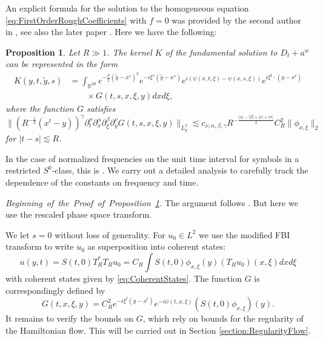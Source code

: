 \documentclass{amsart}
\newtheorem{proposition}[theorem]{Proposition}
\theoremstyle{definition}
\newcommand{\R}{\mathbb{R}}
\begin{document}
An explicit formula for the solution to the homogeneous equation \eqref{eq:FirstOrderRoughCoefficients} with $f =0$ was provided by the second author in \cite{T:phase-space}, see also the later paper \cite{KochTataru05}. Here we have the following:
\begin{proposition}
\label{prop:ParametrixConstruction}
Let $R \gg 1$. The kernel $K$ of the fundamental solution to $D_t + a^w$  can be represented in the form
\begin{equation}
\label{eq:KernelFundamentalSolution}
\begin{split}
K(y,t,\tilde{y},s) &= \int_{\R^{2d}} e^{-\frac{\rho}{2}(\tilde{y}-x^s)^2} e^{-i \xi^s (\tilde{y}-x^s)} e^{i ( \psi(x,t,\xi) - \psi(x,s,\xi))} e^{i  \xi^t \cdot (y-x^t)} \\
&\quad \quad \times G(t,s,x,\xi,y) dx d\xi,
\end{split}
\end{equation}
where the function $G$ satisfies
\begin{equation}
\label{eq:RegularityGreen}
\| (R^{-\frac{1}{2}}(x^t - y))^{\gamma} \partial_t^{\sigma} \partial_x^{\alpha} \partial_{\xi}^{\beta} \partial_y^{\nu} G(t,s,x,\xi,y) \|_{L_y^2} \lesssim c_{\nu,\alpha,\beta,\gamma} R^{-\frac{|\alpha| - |\beta| + |\nu|+|\sigma|}{2}} C_R^2 \| \phi_{x,\xi} \|_2
\end{equation}
for $|t-s| \lesssim R$.
\end{proposition}
In the case of normalized frequencies on the unit time interval for symbols in a restricted $S^{0}$-class, this is \cite[Theorem 5]{T:phase-space}. We carry out a detailed analysis to carefully track the dependence of the constants on frequency and time.

\smallskip

\emph{Beginning~of~the~Proof~of~Proposition~\ref{prop:ParametrixConstruction}.} The argument follows \cite[Proposition~4.3]{KochTataru05}. But here we use the rescaled phase space transform.

We let $s=0$ without loss of generality. For $u_0 \in L^2$ we use the modified FBI transform to write $u_0$ as superposition into coherent states:
\begin{equation}
\label{eq:SuperpositionCoherent}
u(y,t) =  S(t,0) T_R^* T_R u_0 = C_{R} \int S(t,0) \phi_{x,\xi}(y) (T_R u_0)(x,\xi) dx d\xi
\end{equation}
with coherent states given by \eqref{eq:CoherentStates}. The function $G$ is correspondingly defined by
\begin{equation*}
G(t,x,\xi,y) = C^2_{R} e^{-i \xi^t (y-x^t)} e^{-i \psi(t,x,\xi)} (S(t,0) \phi_{x,\xi})(y).
\end{equation*}
It remains to verify the bounds on $G$, which rely on bounds for the regularity of the Hamiltonian flow. This will be carried out in Section \ref{section:RegularityFlow}. 
\end{document}
